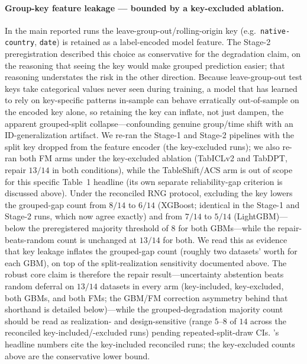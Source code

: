 \documentclass[11pt]{article}
\begin{document}
\paragraph{Group-key feature leakage --- bounded by a key-excluded ablation.} In the main reported runs the
leave-group-out/rolling-origin key (e.g.\ \texttt{native-country}, \texttt{date}) is retained as a
label-encoded model feature. The Stage-2 preregistration described this choice as conservative for the
degradation claim, on the reasoning that seeing the key would make grouped prediction easier; that
reasoning understates the risk in the other direction. Because leave-group-out test keys take categorical
values never seen during training, a model that has learned to rely on key-specific patterns in-sample can
behave erratically out-of-sample on the encoded key alone, so retaining the key can inflate, not just
dampen, the apparent grouped-split collapse---confounding genuine group/time shift with an ID-generalization
artifact. We re-ran the Stage-1 and Stage-2 pipelines with the split key dropped from the feature encoder (the
key-excluded runs); we also re-ran both FM arms under the key-excluded
ablation (TabICLv2 and TabDPT, repair $13/14$ in both conditions), while the TableShift/ACS arm is out of scope
for this specific Table~1 headline (its own separate reliability-gap criterion is discussed above). Under the reconciled RNG
protocol, excluding the key lowers the grouped-gap count from $8/14$ to $6/14$ (XGBoost; identical in the
Stage-1 and Stage-2 runs, which now agree exactly) and from $7/14$ to $5/14$ (LightGBM)---below the
preregistered majority threshold of $8$ for both GBMs---while the repair-beats-random count is unchanged
at $13/14$ for both. We read this as evidence that key leakage inflates the grouped-gap count (roughly
two datasets' worth for each GBM), on top of the split-realization sensitivity documented above. The
robust core claim is therefore the repair result---uncertainty abstention beats random deferral on
$13/14$ datasets in every arm (key-included, key-excluded, both GBMs, and both FMs; the GBM/FM correction
asymmetry behind that shorthand is detailed below)---while the grouped-degradation majority count should be
read as realization- and design-sensitive (range $5$--$8$ of $14$ across the reconciled
key-included/-excluded runs) pending repeated-split-draw CIs. 's headline numbers cite the
key-included reconciled runs; the key-excluded counts above are the conservative lower bound.
\end{document}
